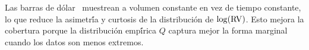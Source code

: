 Las barras de d\'{o}lar~\citep{lopezdeprado2018} muestrean a volumen constante en vez de
tiempo constante, lo que reduce la asimetr\'{\'i}a y curtosis de la distribuci\'{o}n de
$\log(\operatorname{RV})$. Esto mejora la cobertura porque la distribuci\'{o}n emp\'{\'i}rica $Q$
captura mejor la forma marginal cuando los datos son menos extremos.